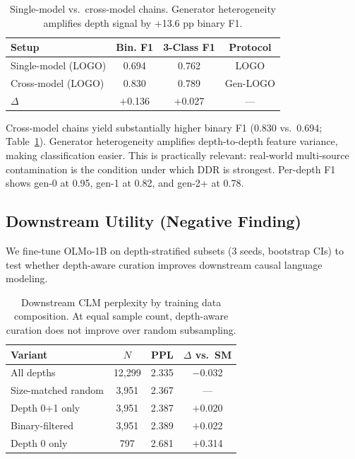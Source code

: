 \documentclass[11pt,a4paper]{article}
\begin{document}
\begin{table}[t]
\centering
\small
\begin{tabular}{lccc}
\toprule
\textbf{Setup} & \textbf{Bin. F1} & \textbf{3-Class F1} & \textbf{Protocol} \\
\midrule
Single-model (LOGO) & 0.694 & 0.762 & LOGO \\
Cross-model (LOGO) & 0.830 & 0.789 & Gen-LOGO \\
$\Delta$ & $+$0.136 & $+$0.027 & — \\
\bottomrule
\end{tabular}
\caption{Single-model vs.\ cross-model chains. Generator heterogeneity amplifies depth signal by $+$13.6 pp binary F1.}
\label{tab:cross_model}
\end{table}

Cross-model chains yield substantially higher binary F1 (0.830 vs.\ 0.694; Table~\ref{tab:cross_model}).
Generator heterogeneity amplifies depth-to-depth feature variance, making classification easier.
This is practically relevant: real-world multi-source contamination is the condition under which DDR is strongest.
Per-depth F1 shows gen-0 at 0.95, gen-1 at 0.82, and gen-2+ at 0.78.

\subsection{Downstream Utility (Negative Finding)}

We fine-tune OLMo-1B on depth-stratified subsets (3 seeds, bootstrap CIs) to test whether depth-aware curation improves downstream causal language modeling.

\begin{table}[t]
\centering
\small
\begin{tabular}{lccc}
\toprule
\textbf{Variant} & \textbf{$N$} & \textbf{PPL} & \textbf{$\Delta$ vs.\ SM} \\
\midrule
All depths & 12,299 & 2.335 & $-$0.032 \\
Size-matched random & 3,951 & 2.367 & — \\
Depth 0+1 only & 3,951 & 2.387 & $+$0.020 \\
Binary-filtered & 3,951 & 2.389 & $+$0.022 \\
Depth 0 only & 797 & 2.681 & $+$0.314 \\
\bottomrule
\end{tabular}
\caption{Downstream CLM perplexity by training data composition. At equal sample count, depth-aware curation does not improve over random subsampling.}
\label{tab:downstream}
\end{table}
\end{document}
